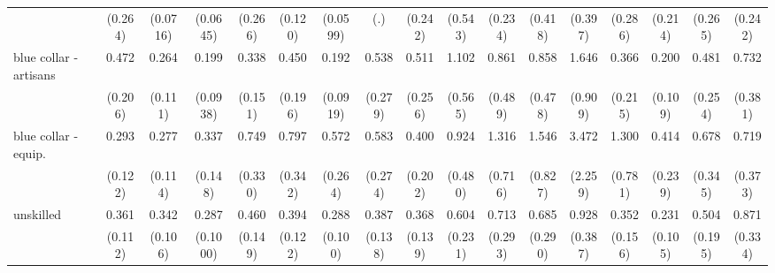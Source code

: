 {\begin{tabular}{l*{16}{c}}
                    &     (0.264)         &    (0.0716)         &    (0.0645)         &     (0.266)         &     (0.120)         &    (0.0599)         &         (.)         &     (0.242)         &     (0.543)         &     (0.234)         &     (0.418)         &     (0.397)         &     (0.286)         &     (0.214)         &     (0.265)         &     (0.242)         \\
[1em]
blue collar - artisans&       0.472         &       0.264\sym{**} &       0.199\sym{***}&       0.338\sym{*}  &       0.450         &       0.192\sym{***}&       0.538         &       0.511         &       1.102         &       0.861         &       0.858         &       1.646         &       0.366         &       0.200\sym{**} &       0.481         &       0.732         \\
                    &     (0.206)         &     (0.111)         &    (0.0938)         &     (0.151)         &     (0.196)         &    (0.0919)         &     (0.279)         &     (0.256)         &     (0.565)         &     (0.489)         &     (0.478)         &     (0.909)         &     (0.215)         &     (0.109)         &     (0.254)         &     (0.381)         \\
[1em]
blue collar - equip.&       0.293\sym{**} &       0.277\sym{**} &       0.337\sym{*}  &       0.749         &       0.797         &       0.572         &       0.583         &       0.400         &       0.924         &       1.316         &       1.546         &       3.472         &       1.300         &       0.414         &       0.678         &       0.719         \\
                    &     (0.122)         &     (0.114)         &     (0.148)         &     (0.330)         &     (0.342)         &     (0.264)         &     (0.274)         &     (0.202)         &     (0.480)         &     (0.716)         &     (0.827)         &     (2.259)         &     (0.781)         &     (0.239)         &     (0.345)         &     (0.373)         \\
[1em]
unskilled           &       0.361\sym{***}&       0.342\sym{***}&       0.287\sym{***}&       0.460\sym{*}  &       0.394\sym{**} &       0.288\sym{***}&       0.387\sym{**} &       0.368\sym{**} &       0.604         &       0.713         &       0.685         &       0.928         &       0.352\sym{*}  &       0.231\sym{**} &       0.504         &       0.871         \\
                    &     (0.112)         &     (0.106)         &    (0.1000)         &     (0.149)         &     (0.122)         &     (0.100)         &     (0.138)         &     (0.139)         &     (0.231)         &     (0.293)         &     (0.290)         &     (0.387)         &     (0.156)         &     (0.105)         &     (0.195)         &     (0.334)         \\

\end{tabular}}
